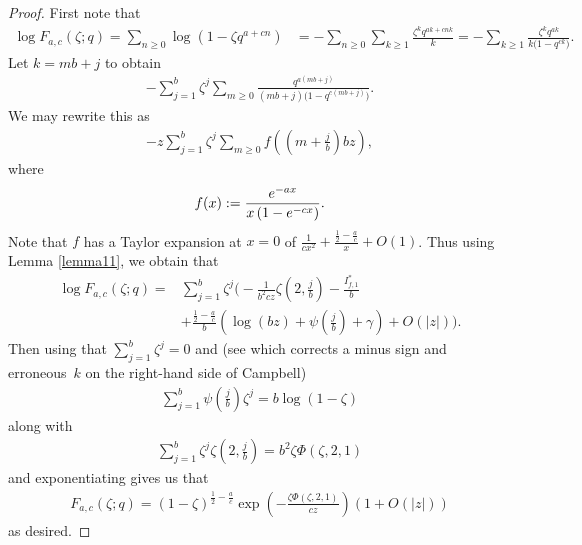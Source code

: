 \documentclass[10pt,a4paper]{amsart}
\numberwithin{equation}{section}
\begin{document}
\begin{proof}
	First note that
	\begin{align*}
		\log F_{a,c}(\zeta;q) = \sum_{n \geq 0} \log\left(1- \zeta q^{a+cn}\right) &= -\sum_{n \geq 0} \sum_{k \geq 1} \frac{\zeta^k q^{ak+cnk}}{k} = -\sum_{k \geq 1} \frac{\zeta^k q^{ak}}{k \big(1-q^{ck}\big)}.
	\end{align*}
Let $k = mb+j$ to obtain
\begin{align*}
	- \sum_{j=1}^{b} \zeta^j \sum_{m \geq 0} \frac{ q^{a(mb+j)}}{(mb+j) \big(1-q^{c(mb+j)}\big)}.
\end{align*}
We may rewrite this as
\begin{align*}
	- z \sum_{j=1}^{b} \zeta^j \sum_{m \geq 0} f\left( \left(m +\frac{j}{b}\right) bz \right),
\end{align*}
where
\begin{align*}
	f(x) := \frac{{\rm e}^{-ax}}{x \left(1- {\rm e}^{-cx}\right)}.
\end{align*}
Note that $f$ has a Taylor expansion at $x=0$ of $\frac{1}{cx^2} + \frac{\frac{1}{2} - \frac{a}{c}}{x} +O(1)$.
Thus using Lemma \ref{lemma11}, we obtain that
\begin{align*}
		\log F_{a,c}(\zeta;q) = {}& \sum_{j=1}^{b} \zeta^j \biggl( -\frac{1}{b^2 c z} \zeta\left(2,\frac{j}{b} \right) - \frac{I^*_{f,1}}{b}\\
& + \frac{\frac{1}{2} -\frac{a}{c}}{b} \left(\log(bz) + \psi\left(\frac{j}{b}\right) +\gamma \right) +O(|z|) \biggr).
\end{align*}
Then using that $\sum_{j=1}^b \zeta^{j}=0$ and \cite[p.~39]{Campbell} (see \cite{BCMO} which corrects a minus sign and erroneous~$k$ on the right-hand side of Campbell)
\begin{align*}%
	\sum_{j=1}^b \psi \left( \frac{j}{b} \right) \zeta^{j}=b \log ( 1-\zeta )
\end{align*}
along with
\begin{align*}
	\sum_{j =1}^{b} \zeta^j \zeta\left(2 , \frac{j}{b}\right) = b^2 \zeta \Phi(\zeta,2,1)
\end{align*}
and exponentiating gives us that
\begin{align*}
		F_{a,c}(\zeta;q) = (1-\zeta)^{\frac{1}{2} - \frac{a}{c}}\exp\left( - \frac{\zeta \Phi(\zeta,2,1)}{ c z} \right) ( 1+ O(|z|) )
\end{align*}
as desired.
\end{proof}
\end{document}
